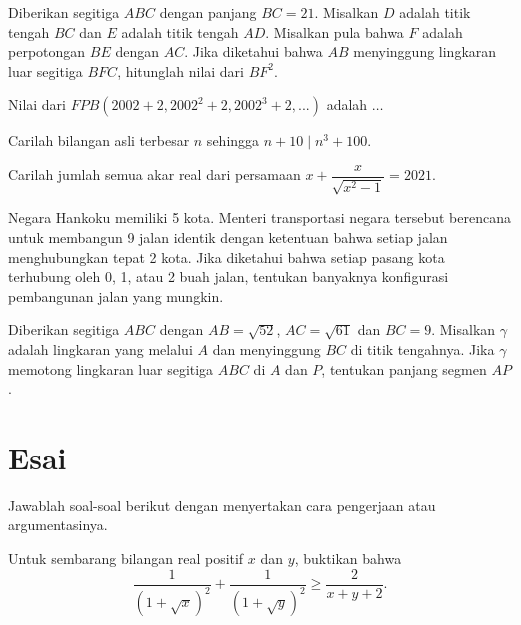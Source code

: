 \documentclass[12pt]{scrartcl}
\begin{document}
	
	
	\begin{soalbaru}
		Diberikan segitiga $ABC$ dengan panjang $BC = 21$. Misalkan $D $ adalah titik tengah
		$BC $ dan $E $ adalah titik tengah $AD$. Misalkan pula bahwa $F $ adalah perpotongan $BE$
		dengan $AC$. Jika diketahui bahwa $AB $ menyinggung lingkaran luar segitiga $BFC$,
		hitunglah nilai dari $BF^2$.
	\end{soalbaru}
	
	\begin{soalbaru}
		Nilai dari $FPB(2002+2,2002^2+2,2002^3+2,...)$ adalah $\dots$
	\end{soalbaru}
	
	\begin{soalbaru}
		Carilah bilangan asli terbesar $n$ sehingga $n+10 \mid n^3+100$.
	\end{soalbaru}
	
	\begin{soalbaru}
		Carilah jumlah semua akar real dari persamaan $x+\dfrac{x}{\sqrt{x^2-1}}=2021.$
	\end{soalbaru}
	
	\begin{soalbaru}
		Negara Hankoku memiliki 5 kota. Menteri transportasi negara tersebut berencana untuk
		membangun 9 jalan identik dengan ketentuan bahwa setiap jalan menghubungkan
		tepat 2 kota. Jika diketahui bahwa setiap pasang kota terhubung oleh 0, 1, atau 2
		buah jalan, tentukan banyaknya konfigurasi pembangunan jalan yang mungkin.
	\end{soalbaru}
	
	\begin{soalbaru}
		Diberikan segitiga $ABC $ dengan $AB = \sqrt{52}$, $AC=\sqrt{61}$ dan $BC = 9$. Misalkan $\gamma$
		adalah lingkaran yang melalui $A$ dan menyinggung $BC$ di titik tengahnya. Jika $\gamma$
		memotong lingkaran luar segitiga $ABC$ di $A$ dan $P$, tentukan panjang segmen $AP$.
	\end{soalbaru}
	
	\section{Esai}
	Jawablah soal-soal berikut dengan menyertakan cara pengerjaan atau argumentasinya.
	
	\begin{soalbaru}
	Untuk sembarang bilangan real positif $x$ dan $y$, buktikan bahwa $$\dfrac{1}{(1+\sqrt{x})^2}+\dfrac{1}{(1+\sqrt{y})^2} \ge \dfrac{2}{x+y+2}.$$
	\end{soalbaru}
	
\end{document}
